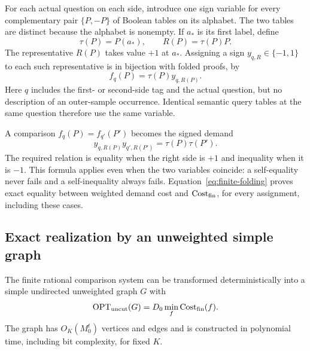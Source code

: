 For each actual question on each side, introduce one sign variable for
every complementary pair $\{P,-P\}$ of Boolean tables on its alphabet.
The two tables are distinct because the alphabet is nonempty. If $a_*$
is its first label, define
\[
 \tau(P)=P(a_*),\qquad R(P)=\tau(P)P.
\]
The representative $R(P)$ takes value $+1$ at $a_*$. Assigning a sign
$y_{q,R}\in\{-1,1\}$ to each such representative is in bijection with
folded proofs, by
\begin{equation}\label{eq:finite-folding}
 f_q(P)=\tau(P)y_{q,R(P)}.
\end{equation}
Here $q$ includes the first- or second-side tag and the actual question,
but no description of an outer-sample occurrence. Identical semantic
query tables at the same question therefore use the same variable.

A comparison $f_q(P)=f_{q'}(P')$ becomes the signed demand
\begin{equation}\label{eq:signed-demand}
 y_{q,R(P)}y_{q',R(P')}=\tau(P)\tau(P').
\end{equation}
The required relation is equality when the right side is $+1$ and
inequality when it is $-1$. This formula applies even when the two
variables coincide: a self-equality never fails and a self-inequality
always fails. Equation~\eqref{eq:finite-folding} proves exact equality
between weighted demand cost and $\operatorname{Cost}_{\mathrm{fin}}$, for every
assignment, including these cases.

\subsection{Exact realization by an unweighted simple graph}

\begin{lemma}\label{lem:graph-realization}
The finite rational comparison system can be transformed deterministically
into a simple undirected unweighted graph $G$ with
\begin{equation}\label{eq:exact-graph-optimum}
 \operatorname{OPT}_{\mathrm{uncut}}(G)
 =D_0\min_f\operatorname{Cost}_{\mathrm{fin}}(f).
\end{equation}
The graph has $O_K(M_0^t)$ vertices and edges and is constructed in
polynomial time, including bit complexity, for fixed $K$.
\end{lemma}

